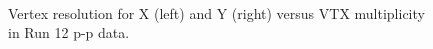 \documentclass[12pt]{article}
\begin{document}
\begin{figure}[t!]
\begin{center}
 \\
  \caption{Vertex resolution for X (left) and Y (right) versus VTX multiplicity in Run 12 p-p data.}
  \label{fig:DCAResVTXMult}
\end{center}
\end{figure}  
\end{document}
